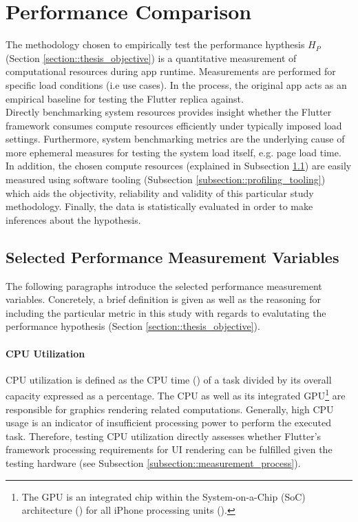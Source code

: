 \section{Performance Comparison} \label{section::performance_comparison_design}
The methodology chosen to empirically test the performance hypthesis $H_P$ (Section \ref{section::thesis_objective}) is a quantitative
measurement of computational resources during app runtime. Measurements are performed for
specific load conditions (i.e use cases). In the process, the original app acts as an empirical
baseline for testing the Flutter replica against.\\
Directly benchmarking system resources provides insight whether the Flutter framework consumes
compute resources efficiently under typically imposed load settings. Furthermore, system
benchmarking metrics are the underlying cause of more ephemeral measures for testing the
system load itself, e.g. page load time. In addition, the chosen compute resources (explained
in Subsection \ref{subsection::selected_measurement_variables}) are easily measured using software tooling (Subsection \ref{subsection::profiling_tooling}) which aids the
objectivity, reliability and validity of this particular study methodology.
Finally, the data is statistically evaluated in order to make inferences about the hypothesis.

\subsection{Selected Performance Measurement Variables} \label{subsection::selected_measurement_variables}
The following paragraphs introduce the selected performance measurement variables. Concretely,
a brief definition is given as well as the reasoning for including the particular metric in
this study with regards to evalutating the performance hypothesis (Section \ref{section::thesis_objective}).

\paragraph*{CPU Utilization}\label{paragraph::cpu_utilization}\hfill \break
CPU utilization is defined as the CPU time (\cite{FSF1988}) of a task
divided by its overall capacity expressed as a percentage. The CPU as well as its integrated GPU\footnote{The GPU is an integrated chip within the System-on-a-Chip (SoC) architecture (\cite{Martin2001}) for all
iPhone processing units (\cite{WikiChip2020}).}
are responsible for graphics rendering related computations. Generally, high CPU usage is an
indicator of insufficient processing power to perform the executed task. Therefore, testing CPU utilization
directly assesses whether Flutter’s framework processing requirements for UI rendering can be
fulfilled given the testing hardware (see Subsection \ref{subsection::measurement_process}).

